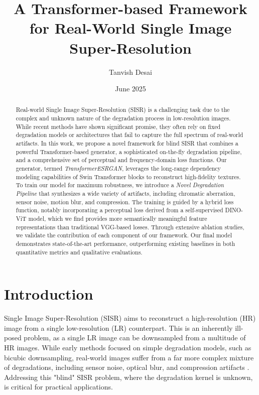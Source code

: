 \documentclass{article}
\title{A Transformer-based Framework for Real-World Single Image Super-Resolution}
\author{Tanvish Desai}
\date{June 2025}
\begin{document}
\maketitle

\begin{abstract}
\noindent %
Real-world Single Image Super-Resolution (SISR) is a challenging task due to the complex and unknown nature of the degradation process in low-resolution images. While recent methods have shown significant promise, they often rely on fixed degradation models or architectures that fail to capture the full spectrum of real-world artifacts. In this work, we propose a novel framework for blind SISR that combines a powerful Transformer-based generator, a sophisticated on-the-fly degradation pipeline, and a comprehensive set of perceptual and frequency-domain loss functions. Our generator, termed \textit{TransformerESRGAN}, leverages the long-range dependency modeling capabilities of Swin Transformer blocks to reconstruct high-fidelity textures. To train our model for maximum robustness, we introduce a \textit{Novel Degradation Pipeline} that synthesizes a wide variety of artifacts, including chromatic aberration, sensor noise, motion blur, and compression. The training is guided by a hybrid loss function, notably incorporating a perceptual loss derived from a self-supervised DINO-ViT model, which we find provides more semantically meaningful feature representations than traditional VGG-based losses. Through extensive ablation studies, we validate the contribution of each component of our framework. Our final model demonstrates state-of-the-art performance, outperforming existing baselines in both quantitative metrics and qualitative evaluations.
\end{abstract}

\section{Introduction}

Single Image Super-Resolution (SISR) aims to reconstruct a high-resolution (HR) image from a single low-resolution (LR) counterpart. This is an inherently ill-posed problem, as a single LR image can be downsampled from a multitude of HR images. While early methods focused on simple degradation models, such as bicubic downsampling, real-world images suffer from a far more complex mixture of degradations, including sensor noise, optical blur, and compression artifacts \cite{realesrgan}. Addressing this "blind" SISR problem, where the degradation kernel is unknown, is critical for practical applications.
\end{document}
